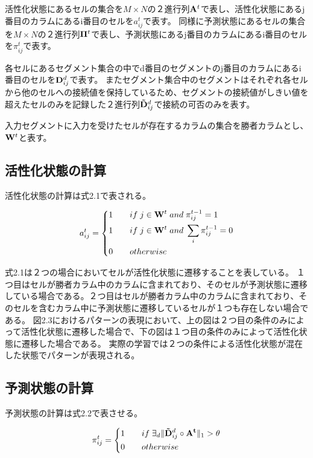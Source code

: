 活性化状態にあるセルの集合を$M \times N$の２進行列${\bf A}^t$で表し、活性化状態にあるj番目のカラムにあるi番目のセルを$a^t_{ij}$で表す。
同様に予測状態にあるセルの集合を$M \times N$の２進行列${\bf \Pi}^t$で表し、予測状態にあるj番目のカラムにあるi番目のセルを$\pi^t_{ij}$で表す。

各セルにあるセグメント集合の中でd番目のセグメントのj番目のカラムにあるi番目のセルを${\bf D}^d_{ij}$で表す。
またセグメント集合中のセグメントはそれぞれ各セルから他のセルへの接続値を保持しているため、セグメントの接続値がしきい値を超えたセルのみを記録した２進行列${\bf \tilde{D}}^d_{ij}$で接続の可否のみを表す。

入力セグメントに入力を受けたセルが存在するカラムの集合を勝者カラムとし、${\bf W}^t$と表す。

\subsection{活性化状態の計算}
活性化状態の計算は式2.1で表される。

\begin{equation}
  a^t_{ij} =
  \left\{
  \begin{alignedat}{3}
    1 \qquad &if \; j\in{\bf W}^t \; and \; \pi^{t-1}_{ij} = 1\\
    1 \qquad &if \; j\in{\bf W}^t \; and \; \sum_i \pi^{t-1}_{ij} = 0\\
    0 \qquad &otherwise
  \end{alignedat}
  \right.
\end{equation}

式2.1は２つの場合においてセルが活性化状態に遷移することを表している。
１つ目はセルが勝者カラム中のカラムに含まれており、そのセルが予測状態に遷移している場合である。２つ目はセルが勝者カラム中のカラムに含まれており、そのセルを含むカラム中に予測状態に遷移しているセルが１つも存在しない場合である。
図2.3におけるパターンの表現において、上の図は２つ目の条件のみによって活性化状態に遷移した場合で、下の図は１つ目の条件のみによって活性化状態に遷移した場合である。
実際の学習では２つの条件による活性化状態が混在した状態でパターンが表現される。

\subsection{予測状態の計算}
予測状態の計算は式2.2で表させる。

\begin{equation}
  \pi^t_{ij} =
  \left\{
  \begin{alignedat}{2}
    1 \qquad &if \; \exists_d\|{\bf \tilde{D}}^d_{ij} \circ {\bf A^t}\|_1 > \theta\\
    0 \qquad &otherwise
  \end{alignedat}
  \right.
\end{equation}

